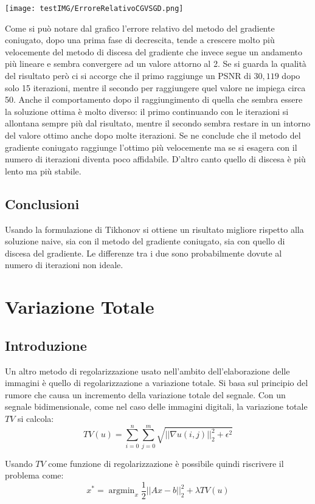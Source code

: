 \documentclass{article}
\DeclareMathOperator*{\argmin}{argmin}
\begin{document}
\begin{center}
    \texttt{[image: testIMG/ErroreRelativoCGVSGD.png]}
\end{center}

Come si può notare dal grafico l'errore relativo del metodo del gradiente coniugato, dopo
una prima fase di decrescita, tende a crescere molto più velocemente del metodo di discesa
del gradiente che invece segue un andamento più lineare e sembra convergere ad un
valore attorno al 2. 
Se si guarda la qualità del risultato però ci si accorge che il primo raggiunge un PSNR di
$30,119$ dopo solo 15 iterazioni, mentre il secondo per raggiungere quel valore ne impiega
circa 50. Anche il comportamento dopo il raggiungimento di quella che sembra essere la
soluzione ottima è molto diverso: il primo continuando con le iterazioni si allontana
sempre più dal risultato, mentre il secondo sembra restare in un intorno del valore ottimo
anche dopo molte iterazioni. 
Se ne conclude che il metodo del gradiente coniugato raggiunge l'ottimo più velocemente
ma se si esagera con il numero di iterazioni diventa poco affidabile. D'altro canto quello
di discesa è più lento ma più stabile.

\subsection{Conclusioni}
Usando la formulazione di Tikhonov si ottiene un risultato migliore rispetto alla soluzione naive, sia con il metodo del gradiente coniugato, sia con quello di discesa del gradiente. Le differenze tra i due sono probabilmente dovute al numero di iterazioni non ideale.

\section{Variazione Totale}
\subsection{Introduzione}
Un altro metodo di regolarizzazione usato nell'ambito dell'elaborazione delle immagini è quello di
regolarizzazione a variazione totale. Si basa sul principio del rumore che causa un
incremento della variazione totale del segnale. Con un segnale bidimensionale, come nel caso delle
immagini digitali, la variazione totale $TV$ si calcola:
$$
TV(u)=\sum_{i=0}^n \sum_{j=0}^m \sqrt{|| \nabla u(i,j)||_2^2 + \epsilon^2}
$$

Usando $TV$ come funzione di regolarizzazione è possibile quindi riscrivere il problema come:
$$ x^* = \argmin_x \frac{1}{2}||Ax - b||_2^2 + \lambda TV(u)$$
\end{document}
